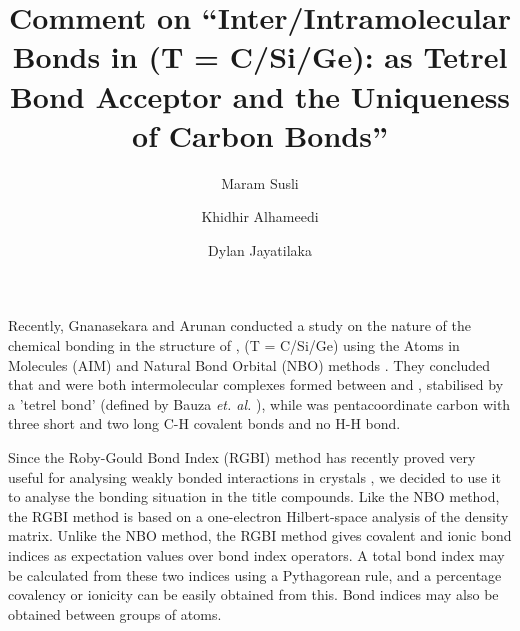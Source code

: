 \documentclass[journal=jpcafh,manuscript=letter]{achemso}
\author{Maram Susli}
\author{Khidhir Alhameedi}
\author{Dylan Jayatilaka}
\affiliation[UWA]
{School of Molecular Sciences, The University of Western Australia, %
35 Stirling Highway, Crawley 6009, Western Australia}
\title[An \textsf{achemso} demo]
  {Comment on ``Inter/Intramolecular Bonds in \ce{TH5+} (T = C/Si/Ge): 
  \ce{H2} as Tetrel Bond Acceptor and the Uniqueness of Carbon Bonds''}
\begin{document}
%  
%  
%  
%  
%  





Recently, Gnanasekara and Arunan conducted a study on 
the nature of the chemical bonding in the structure of
, (T = C/Si/Ge) using the Atoms in Molecules (AIM)
and Natural Bond Orbital (NBO) methods \cite{Arunan2019}.
They concluded that  and  were both
intermolecular complexes formed between  and 
, stabilised by a 'tetrel bond' (defined
by Bauza {\em et. al.} \cite{Bauza2013}), 
while  was pentacoordinate carbon with three 
short and two long C-H covalent bonds and no H-H bond. 

Since the Roby-Gould Bond Index (RGBI) method \cite{Gould2008} 
has recently proved very useful for analysing weakly 
bonded interactions in crystals \cite{Alhameedi2018}, we 
decided to use it to analyse the bonding situation in the 
title compounds. Like the NBO method, the RGBI method is based 
on a one-electron Hilbert-space analysis of the density matrix.
Unlike the NBO method, the RGBI method gives covalent and 
ionic bond indices as expectation values over bond index operators.
A total bond index may be calculated from these two indices
using a Pythagorean rule, and a percentage covalency
or ionicity can be easily obtained from this.
Bond indices may also be obtained between groups of atoms.
\end{document}
